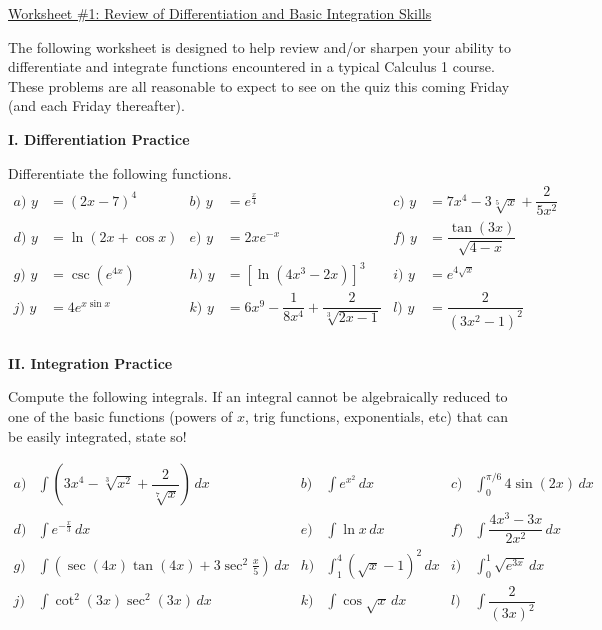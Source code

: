 \documentclass[a4paper,12pt]{article}
\begin{document}
\flushleft

\Large
\underline{Worksheet \#1: Review of Differentiation and Basic Integration Skills}

\normalsize

\vspace{3mm}

The following worksheet is designed to help review and/or sharpen your ability to differentiate and integrate functions encountered in a typical Calculus 1 course.  These problems are all reasonable to expect to see on the quiz this coming Friday (and each Friday thereafter).

\vspace{5mm}

\textbf{I. Differentiation Practice}

Differentiate the following functions.
\begin{align*}
a)  \, \, y &= (2x-7)^4  & b) \, \, y &=  e^{\frac{x}{4}} & c) \, \, y&= 7x^4-3\sqrt[5]{x} + \dfrac{2}{5x^2} \\
d) \, \, y&= \ln(2x+\cos x) & e) \, \, y&=2xe^{-x} & f) \, \, y&= \dfrac{\tan{(3x)}}{\sqrt{4-x}} \\
g) \, \, y&= \csc{\left(e^{4x}\right)} & h) \, \, y&= [\ln(4x^3-2x)]^3 & i) \, \, y&= e^{4 \sqrt{x}} \\
j) \, \, y&=4e^{x \sin x} & k) \, \, y&= 6x^9-\dfrac{1}{8x^4}+\dfrac{2}{\sqrt[3]{2x-1}} & l) \, \, y &=\dfrac{2}{(3x^2-1)^2} \\
\end{align*}

\textbf{II. Integration Practice}

Compute the following integrals.  If an integral cannot be algebraically reduced to one of the basic functions (powers of $x$, trig functions, exponentials, etc) that can be easily integrated, state so!  

\begin{align*}
a) & \int \left(3x^4-\sqrt[3]{x^2} + \dfrac{2}{\sqrt[7]{x}}\right)  \, dx  & b) & \int e^{x^2} \, dx & c) & \int^{\pi/6}_{0} 4 \sin(2x) \, dx  \\
d) & \int e^{-\frac{x}{3}} \, dx  & e) & \int \ln x \, dx & f) & \int \dfrac{4x^3-3x}{2x^2} \, dx  \\
g) & \int \left( \sec(4x) \tan(4x) + 3 \sec^2 \frac{x}{5} \right) \, dx  & h) & \int^4_1 (\sqrt{x}-1)^2 \, dx  & i) & \int_0^1 \sqrt{e^{3x}} \, dx  \\
j) &\int \cot^2 (3x) \sec^2 (3x) \, dx & k) & \int \cos \sqrt{x} \, dx & l) & \int \dfrac{2}{(3x)^2} \\
\end{align*}
\end{document}
